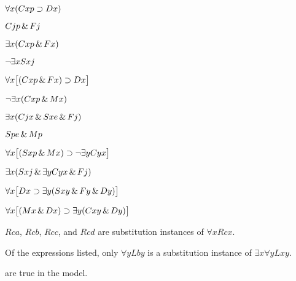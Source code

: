 \begin{earg}
\item %
$\forall x(Cxp \supset Dx)$
\item %
$Cjp \,\&\, Fj$
\item %
$\exists x(Cxp \,\&\, Fx)$
\item %
$\neg\exists x Sxj$
\item %
$\forall x\bigl[(Cxp \,\&\, Fx)\supset Dx\bigr]$
\item %
$\neg\exists x(Cxp \,\&\, Mx)$
\item %
$\exists x(Cjx \,\&\, Sxe \,\&\, Fj)$
\item %
$Spe \,\&\, Mp$
\item %
$\forall x\bigl[(Sxp \,\&\, Mx) \supset \neg\exists y Cyx\bigr]$
\item %
$\exists x(Sxj \,\&\, \exists y Cyx \,\&\, Fj)$
\item %
$\forall x\bigl[Dx \supset \exists y(Sxy \,\&\, Fy \,\&\, Dy)\bigr]$
\item %
$\forall x\bigl[(Mx \,\&\, Dx) \supset \exists y(Cxy \,\&\, Dy)\bigr]$
\end{earg}

\begin{earg}
\item $Rca$, $Rcb$, $Rcc$, and $Rcd$ are substitution instances of $\forall x Rcx$.
\item Of the expressions listed, only $\forall y Lby$ is a substitution instance of $\exists x\forall y Lxy$.
\end{earg}





\noSeq
\nextSeq
\nextSeq
\nextSeq
\noSeq
\nextSeq
\noSeq
\nextSeq
\lastSeq
are true in the model.

